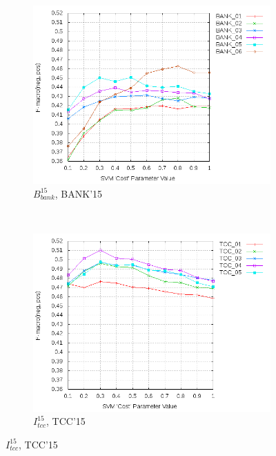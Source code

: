 \begin{figure}[!htp] \centering
    \captionsetup[subfigure]{justification=centering}
    \begin{subfigure}[b]{0.45\textwidth}
        \includegraphics[width=\textwidth]{pics/2015_bank_balanced.png}
        \caption{$B_{bank}^{15}$, BANK'15}
        \label{fig:bank_cost_changes_2015}
    \end{subfigure}
    ~
    \begin{subfigure}[b]{0.45\textwidth}
        \includegraphics[width=\textwidth]{pics/2015_ttk_balanced.png}
        \caption{$I_{tcc}^{15}$, TCC'15}
        \label{fig:tcc_cost_changes_2015}
    \end{subfigure}


\end{figure}
